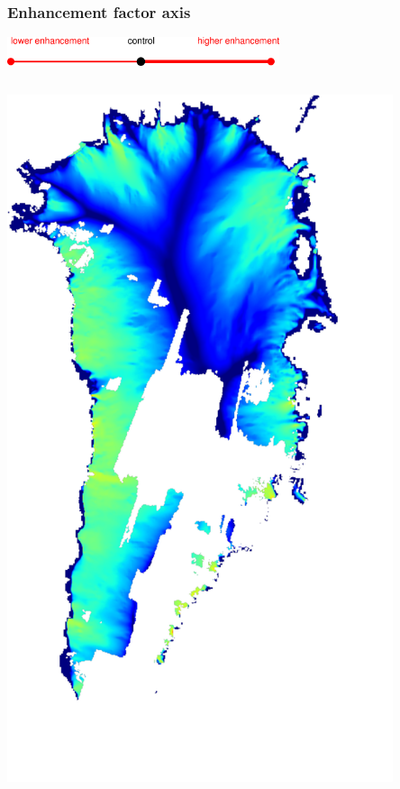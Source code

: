 \documentclass{beamer}
\begin{document}
\begin{frame}
  \frametitle{Enhancement factor axis}

\vspace{-0.1in}
\begin{center}
  \includegraphics[width=0.6\textwidth]{enhancement_axis}
\end{center}

\vspace{-0.1in}
\begin{columns}
\begin{column}{0.33\textwidth}
\begin{center}
  \includegraphics[width=0.85\textwidth]{g3km_1_25_98}

\end{center}
\end{column}
\end{columns}
\end{frame}
\end{document}
